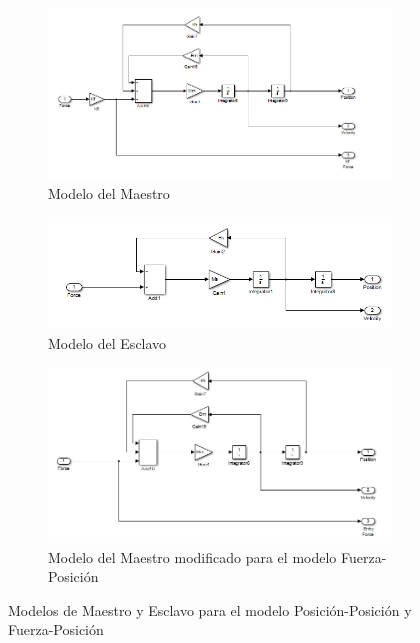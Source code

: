 \documentclass[a4paper, fontsize=11pt]{scrartcl} %
\numberwithin{equation}{section} %
\numberwithin{figure}{section} %
\numberwithin{table}{section} %
\begin{document}
	\begin{figure}[h]
		\centering
		\begin{subfigure}[t]{.5\textwidth}
			\centering
			\includegraphics[width=1\linewidth]{images/Master.PNG}
			\caption{Modelo del Maestro}
			\label{Master}
		\end{subfigure}%
		\begin{subfigure}[t]{.5\textwidth}
			\centering
			\includegraphics[width=1\linewidth]{images/Slave.PNG}
			\caption{Modelo del Esclavo}
			\label{Slave}
		\end{subfigure}
		\begin{subfigure}{\linewidth}
			\centering
			\includegraphics[width=0.5\linewidth]{images/Master_Mod.PNG}
			\caption{Modelo del Maestro modificado para el modelo Fuerza-Posición}
			\label{Modified Master}
		\end{subfigure}
		\caption{Modelos de Maestro y Esclavo para el modelo Posición-Posición y Fuerza-Posición}
		\label{Master_Slave}
	\end{figure}
	\FloatBarrier
	
	\pagebreak
		
\end{document}
